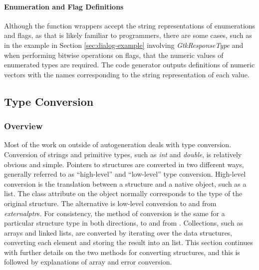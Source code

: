 \documentclass[article]{jss}
\begin{document}
\paragraph{Enumeration and Flag Definitions}
Although the function wrappers accept the string representations of
enumerations 
and flags, as that is likely familiar to  programmers,
there are
some cases, such as in the example in Section \ref{sec:dialog-example}
involving 
\emph{GtkResponseType} and when performing bitwise operations on
flags, that the
numeric values of enumerated types are required. The code generator
outputs 
definitions of  numeric vectors with the names
corresponding to the
string representation of each value.

\subsection{Type Conversion}

\subsubsection{Overview}

Most of the work on  outside of autogeneration deals with
type 
conversion. Conversion of strings and primitive  types,
such as \emph{int} and 
\emph{double}, is relatively obvious and simple. Pointers to
 structures are converted
in two different ways, generally referred to as ``high-level''
and ``low-level'' type conversion. 
High-level conversion is the
translation
between a  structure and a native  object,
such as a list. The class attribute on the object normally corresponds to the type of the original  structure. 
The alternative is low-level conversion to and from
 \emph{externalptr}s. For consistency, the method of
conversion is 
the same for a particular structure type in both directions, to and
from .
Collections, such as arrays and linked 
lists, are converted by iterating over the data structures, converting
each
element and storing the result into an  list. This section
continues
with further details on the two methods for converting 
structures, and this is followed by explanations of array and error
conversion.
\end{document}
